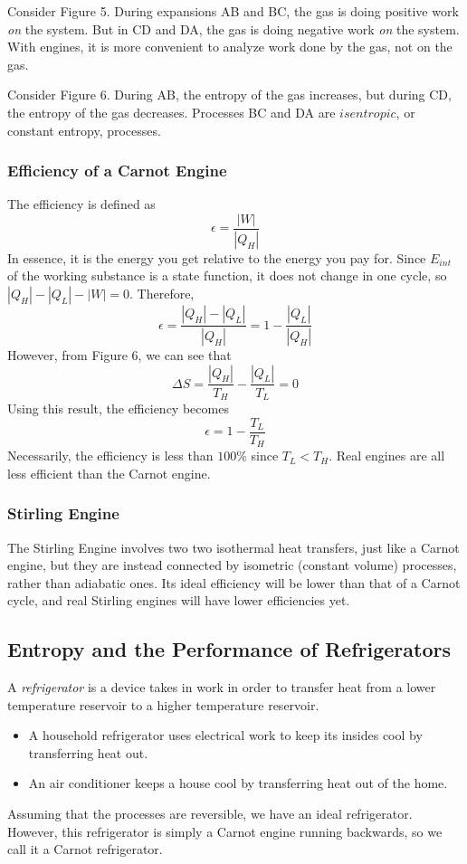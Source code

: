 \documentclass[../PhysicsFormulae.tex]{subfiles}
\begin{document}
Consider Figure 5. During expansions AB and BC, the gas is doing positive work \textit{on} the system. But in CD and DA, the gas is doing negative work \textit{on} the system. With engines, it is more convenient to analyze work done by the gas, not on the gas. \bigskip

Consider Figure 6. During AB, the entropy of the gas increases, but during CD, the entropy of the gas decreases. Processes BC and DA are $isentropic$, or constant entropy, processes. 

\subsubsection{Efficiency of a Carnot Engine}
The efficiency is defined as 
\[ \epsilon = \frac{|W|}{|Q_H|} \]
In essence, it is the energy you get relative to the energy you pay for. Since $E_{int}$ of the working substance is a state function, it does not change in one cycle, so $|Q_H| - |Q_L| - |W| = 0$. Therefore, 
\[ \epsilon = \frac{|Q_H| - |Q_L|}{|Q_H|} = 1 - \frac{|Q_L|}{|Q_H|} \]
However, from Figure 6, we can see that 
\[ \Delta S = \frac{|Q_H|}{T_H} - \frac{|Q_L|}{T_L} = 0 \]
Using this result, the efficiency becomes 
\[ \epsilon = 1 - \frac{T_L}{T_H} \]
Necessarily, the efficiency is less than $100\%$ since $T_L < T_H$. Real engines are all less efficient than the Carnot engine. 

\subsubsection{Stirling Engine}
The Stirling Engine involves two two isothermal heat transfers, just like a Carnot engine, but they are instead connected by isometric (constant volume) processes, rather than adiabatic ones. Its ideal efficiency will be lower than that of a Carnot cycle, and real Stirling engines will have lower efficiencies yet. 

\subsection{Entropy and the Performance of Refrigerators}
A \textit{refrigerator} is a device takes in work in order to transfer heat from a lower temperature reservoir to a higher temperature reservoir. 
\begin{itemize}
	\item A household refrigerator uses electrical work to keep its insides cool by transferring heat out. 
	\item An air conditioner keeps a house cool by transferring heat out of the home. 
\end{itemize}
Assuming that the processes are reversible, we have an ideal refrigerator. However, this refrigerator is simply a Carnot engine running backwards, so we call it a Carnot refrigerator. \bigskip
\end{document}
